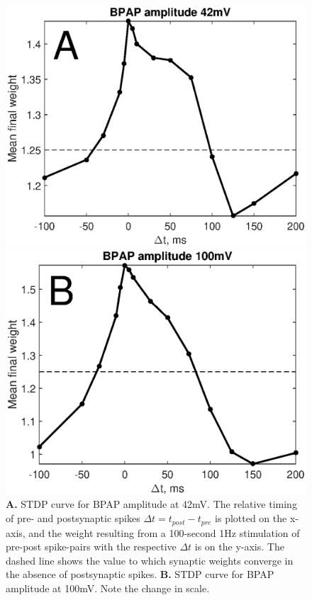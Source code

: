 \documentclass[a4paper,12pt]{report}
\theoremstyle{definition}
\begin{document}
\begin{figure}
\centering
\begin{minipage}{.5\textwidth}
  \centering
  \includegraphics[width=1\linewidth]{figures/valid_stdp_bpap42.eps}
\end{minipage}%
\begin{minipage}{.5\textwidth}
  \centering
  \includegraphics[width=1\linewidth]{figures/valid_stdp_bpap100.eps}
\end{minipage}
\caption{\textbf{A.} STDP curve for BPAP amplitude at 42mV. The relative timing of pre- and postsynaptic spikes $\Delta t = t_{post} - t_{pre}$ is plotted on the x-axis, and the weight resulting from a 100-second 1Hz stimulation of pre-post spike-pairs with the respective $\Delta t$ is on the y-axis. The dashed line shows the value to which synaptic weights converge in the absence of postsynaptic spikes.
\textbf{B.} STDP curve for BPAP amplitude at 100mV. Note the change in scale.}
\label{fig:valid_stdp}
\end{figure}
\end{document}
